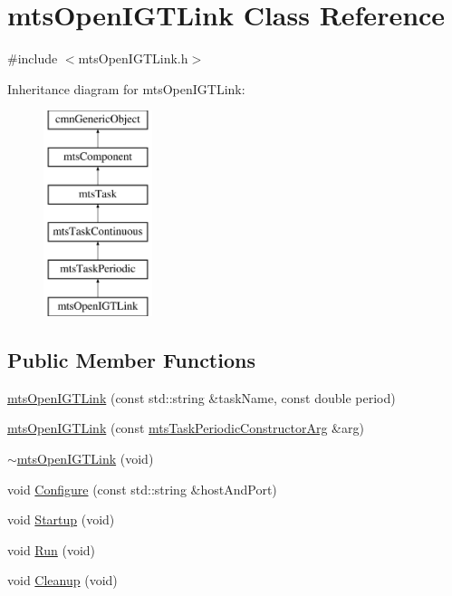 \hypertarget{classmts_open_i_g_t_link}{}\section{mts\+Open\+I\+G\+T\+Link Class Reference}
\label{classmts_open_i_g_t_link}


{\ttfamily \#include $<$mts\+Open\+I\+G\+T\+Link.\+h$>$}

Inheritance diagram for mts\+Open\+I\+G\+T\+Link\+:\begin{figure}[H]
\begin{center}
\leavevmode
\includegraphics[height=6.000000cm]{d4/d9e/classmts_open_i_g_t_link}
\end{center}
\end{figure}
\subsection*{Public Member Functions}
\begin{DoxyCompactItemize}
\item 
\hyperlink{classmts_open_i_g_t_link_a19999bf32cb5e8fda9a5ee16ef540424}{mts\+Open\+I\+G\+T\+Link} (const std\+::string \&task\+Name, const double period)
\item 
\hyperlink{classmts_open_i_g_t_link_a1b81ba9af63a60d2ac9fabfa8250f7fc}{mts\+Open\+I\+G\+T\+Link} (const \hyperlink{classmts_task_periodic_constructor_arg}{mts\+Task\+Periodic\+Constructor\+Arg} \&arg)
\item 
\hyperlink{classmts_open_i_g_t_link_abded02f25c22dccdcbd4b65f7902d88f}{$\sim$mts\+Open\+I\+G\+T\+Link} (void)
\item 
void \hyperlink{classmts_open_i_g_t_link_a10a224364ae3264d636b8a4a6ca6885e}{Configure} (const std\+::string \&host\+And\+Port)
\item 
void \hyperlink{classmts_open_i_g_t_link_a4eac46872e057369d46a21b1ea596acf}{Startup} (void)
\item 
void \hyperlink{classmts_open_i_g_t_link_a5bffb1931626355ec81281d953e1df55}{Run} (void)
\item 
void \hyperlink{classmts_open_i_g_t_link_a4b86831090e4b0ec3b73beedfc570ac7}{Cleanup} (void)
\end{DoxyCompactItemize}

